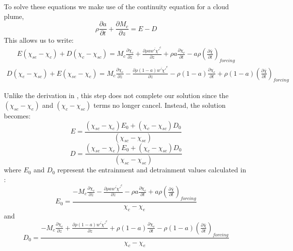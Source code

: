 \documentclass[draft,grl]{AGUTeX}
\begin{document}
\begin{article}
To solve these equations we make use of the continuity equation for a cloud 
plume,
\begin{equation}
   \label{eq:continuity}
   \rho \frac{\partial a}{\partial t} + \frac{\partial M_c}{\partial z} = E - D
\end{equation}
This allows us to write:
\begin{eqnarray}
  \label{eq:entrainment_derivation_2}
    E (\chi_{se} - \chi_c) + D (\chi_c - \chi_{sc}) 
    = M_c \frac{\partial \chi_c}{\partial z}
    + \frac{\partial \rho a \overline{w' \chi'}^c}{\partial z} 
    + \rho a \frac{\partial \chi_c}{\partial t}
    - a \rho \left(\frac{\partial \bar{\chi}}{\partial t}\right)_{forcing}
\end{eqnarray}
\begin{eqnarray}
  \label{eq:detrainment_derivation_2}
    D (\chi_e - \chi_{sc}) + E (\chi_{se} - \chi_e)
    = M_c \frac{\partial \chi_e}{\partial z}
    - \frac{\partial \rho (1 - a) \overline{w' \chi'}^e}{\partial z} 
    - \rho (1 - a) \frac{\partial \chi_e}{\partial t}
    + \rho (1 - a) \left(\frac{\partial \bar{\chi}}{\partial t}\right)_{forcing}
\end{eqnarray}

Unlike the derivation in \cite{Siebesma1995}, this step does not complete our 
solution since the $(\chi_{se} - \chi_e)$ and $(\chi_c - \chi_{sc})$ terms 
no longer cancel.  Instead, the solution becomes:
\begin{equation}
  \label{eq:final_entrainment}
    E = \frac{(\chi_{sc} - \chi_e)E_0 + (\chi_c - \chi_{sc})D_0}
             {(\chi_{sc} - \chi_{se})}
\end{equation}
\begin{equation}
  \label{eq:final_detrainment}
    D = \frac{(\chi_{se} - \chi_e)E_0 + (\chi_c - \chi_{se})D_0}
             {(\chi_{sc} - \chi_{se})}
\end{equation}
where $E_0$ and $D_0$ represent the entrainment and detrainment values
calculated in \cite{Siebesma1995}:
\begin{equation}
  \label{eq:E_0_equation}
    E_0 = \frac{- M_c \frac{\partial \chi_c}{\partial z}
        - \frac{\partial \rho a \overline{w' \chi'}^c}{\partial z}
        - \rho a \frac{\partial \chi_c}{\partial t}
        + a \rho \left(\frac{\partial \bar{\chi}}{\partial t}\right)_{forcing}}
        {\chi_c - \chi_e}
\end{equation}
and
\begin{equation}
  \label{eq:D_0_equation}
    D_0 = \frac{- M_c \frac{\partial \chi_e}{\partial z}
        + \frac{\partial \rho (1 - a) \overline{w' \chi'}^e}{\partial z}
        + \rho (1-a) \frac{\partial \chi_e}{\partial t}
     - \rho (1-a) \left(\frac{\partial \bar{\chi}}{\partial t}\right)_{forcing}}
        {\chi_c - \chi_e}
\end{equation}


\end{article}
\end{document}
